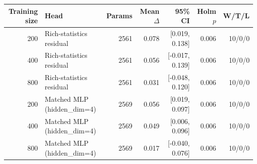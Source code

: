 \begin{tabular}{rlrrrrr}
\toprule
Training size & Head & Params & Mean $\Delta$ & 95\% CI & Holm $p$ & W/T/L \\
\midrule
200 & Rich-statistics residual & 2561 & 0.078 & [0.019, 0.138] & 0.006 & 10/0/0 \\
400 & Rich-statistics residual & 2561 & 0.056 & [-0.017, 0.139] & 0.006 & 10/0/0 \\
800 & Rich-statistics residual & 2561 & 0.031 & [-0.048, 0.120] & 0.006 & 10/0/0 \\
200 & Matched MLP (hidden\_dim=4) & 2569 & 0.056 & [0.019, 0.097] & 0.006 & 10/0/0 \\
400 & Matched MLP (hidden\_dim=4) & 2569 & 0.049 & [0.006, 0.096] & 0.006 & 10/0/0 \\
800 & Matched MLP (hidden\_dim=4) & 2569 & 0.017 & [-0.040, 0.076] & 0.006 & 10/0/0 \\
\bottomrule
\end{tabular}
